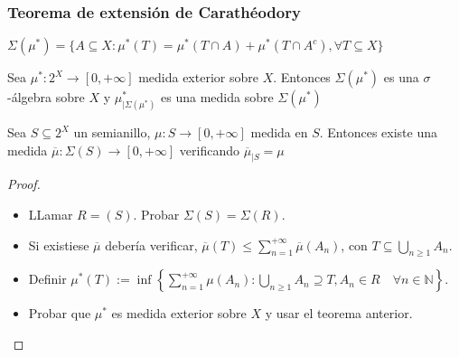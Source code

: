  \begin{frame}\frametitle{Teorema de extensión de Carathéodory}
  \begin{definition}
  $\Sigma(\mu^\ast) = \{A\subseteq X: \mu^\ast(T) = \mu^\ast(T\cap A) + \mu^\ast(T\cap A^c), \forall T\subseteq X\}$
  \end{definition}
  \begin{theorem}
   Sea $\mu^\ast : 2^X \rightarrow [0, +\infty]$ medida exterior sobre $X$. Entonces $\Sigma(\mu^\ast)$
   es una $\sigma$-álgebra sobre $X$ y $\mu^\ast_{|\Sigma(\mu^\ast)}$ es una medida sobre $\Sigma(\mu^\ast)$
  \end{theorem}
 
  \begin{theorem}
   Sea $S \subseteq 2^X$ un semianillo, $\mu:S \rightarrow [0,+\infty]$ medida en $S$. Entonces existe
   una medida $\overline{\mu}:\Sigma(S) \rightarrow [0,+\infty]$ verificando $\overline{\mu}_{|S} = \mu$
   \label{th:caratheodory}
  \end{theorem}
 
 \begin{proof}
  \begin{itemize}
   \item LLamar $R=(S)$. Probar $\Sigma(S) = \Sigma(R)$.
  
   \item Si existiese $\overline{\mu}$ debería verificar, $\overline{\mu}(T) \le \sum_{n=1}^{+\infty} \overline{\mu}(A_n)$, 
    con $T \subseteq \bigcup_{n\ge 1} A_n$.
  
   \item Definir $\mu^\ast(T):= \inf\left\{\sum_{n=1}^{+\infty} \mu(A_n): \bigcup_{n\ge 1} A_n \supseteq T,
                   A_n\in R \quad \forall n\in\mathbb{N}\right\}$.
   \item Probar que $\mu^\ast$ es medida exterior sobre $X$ y usar el teorema anterior.
  \end{itemize}
 \end{proof}
 \end{frame}  
 
